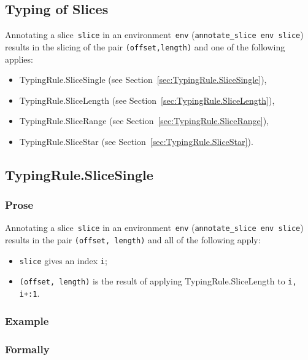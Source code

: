 \documentclass{book}
\begin{document}
\begin{itemize}
\chapter{Typing of Slices \label{ch:typingslices}}

Annotating a slice~\texttt{slice} in an environment~\texttt{env}
(\texttt{annotate\_slice env slice}) results in the slicing of the pair \texttt{(offset,length)} and one of the following applies:
\begin{itemize}
\item TypingRule.SliceSingle (see Section~\ref{sec:TypingRule.SliceSingle}),
\item TypingRule.SliceLength (see Section~\ref{sec:TypingRule.SliceLength}),
\item TypingRule.SliceRange (see Section~\ref{sec:TypingRule.SliceRange}),
\item TypingRule.SliceStar (see Section~\ref{sec:TypingRule.SliceStar}).
\end{itemize}

\section{TypingRule.SliceSingle \label{sec:TypingRule.SliceSingle}}

  \subsection{Prose}
   Annotating a slice~\texttt{slice} in an environment~\texttt{env}
(\texttt{annotate\_slice env slice}) results in the pair \texttt{(offset, length)} and all of the following apply:
   \begin{itemize}
   \item \texttt{slice} gives an index \texttt{i};
   \item \texttt{(offset, length)} is the result of applying TypingRule.SliceLength to \texttt{i, i+:1}.
   \end{itemize}

  \subsection{Example}



\begin{emptyformal}
    \subsection{Formally}
\end{emptyformal}


\end{itemize}
\end{document}
